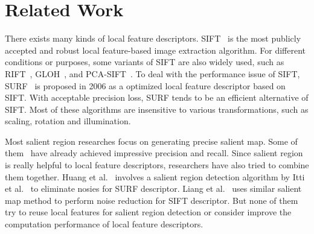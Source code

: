 \section{Related Work}

There exists many kinds of local feature descriptors. SIFT~\cite{lowe1999object}\cite{lowe2004distinctive} is the most publicly accepted and robust local feature-based image extraction algorithm. For different conditions or purposes, some variants of SIFT are also widely used, such as RIFT~\cite{lazebnik2005sparse}, GLOH~\cite{mikolajczyk2005performance}, and PCA-SIFT~\cite{ke2004pca}. To deal with the performance issue of SIFT, SURF~\cite{Bay2006SURF} is proposed in 2006 as a optimized local feature descriptor based on SIFT. With acceptable precision loss, SURF tends to be an efficient alternative of SIFT. Most of these algorithms are insensitive to various transformations, such as scaling, rotation and illumination.

Most salient region researches focus on generating precise salient map. Some of them~\cite{cheng2011global,achanta2009frequency} have already achieved impressive precision and recall. Since salient region is really helpful to local feature descriptors, researchers have also tried to combine them together. Huang et al.~\cite{huang2009image} involves a salient region detection algorithm by Itti et al.~\cite{itti1998model} to eliminate nosies for SURF descriptor. Liang et al.~\cite{liang2010salient} uses similar salient map method to perform noise reduction for SIFT descriptor. But none of them try to reuse local features for salient region detection or consider improve the computation performance of local feature descriptors.